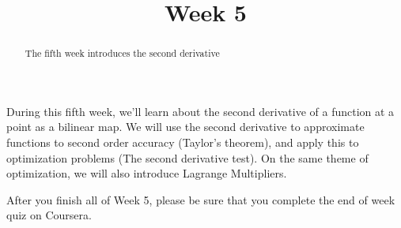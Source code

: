\documentclass{ximera}
\title{Week 5}
\begin{document}
\begin{abstract}
  The fifth week introduces the second derivative
\end{abstract}

During this fifth week, we'll learn about the second derivative of a function at a point as a bilinear map.
We will use the second derivative to approximate functions to second order accuracy (Taylor's theorem), and apply this to 
optimization problems (The second derivative test).  On the same theme of optimization, we will also introduce Lagrange Multipliers.

After you finish all of Week 5, please be sure that you complete the
end of week quiz on Coursera.
\end{document}
